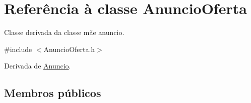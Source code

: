 \hypertarget{class_anuncio_oferta}{\section{Referência à classe Anuncio\+Oferta}
\label{class_anuncio_oferta}
}


Classe derivada da classe mãe anuncio.  




{\ttfamily \#include $<$Anuncio\+Oferta.\+h$>$}



Derivada de \hyperlink{class_anuncio}{Anuncio}.

\subsection*{Membros públicos}
